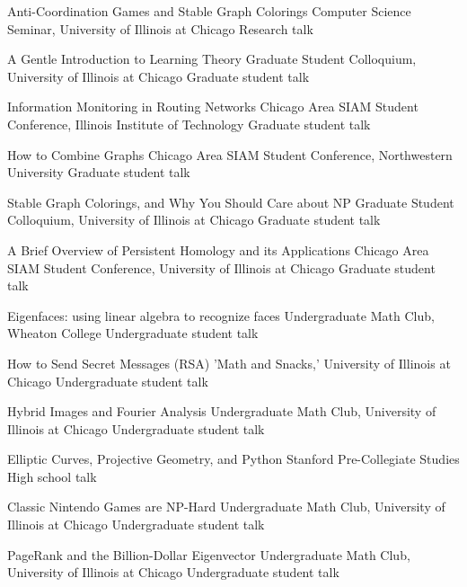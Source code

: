 \documentclass[11pt]{moderncv}
\begin{document}
         {Anti-Coordination Games and Stable Graph Colorings}
      {Computer Science Seminar, University of Illinois at Chicago}
      {Research talk}
      {}
{}

         {A Gentle Introduction to Learning Theory}
      {Graduate Student Colloquium, University of Illinois at Chicago}
      {Graduate student talk}
      {}
{}

         {Information Monitoring in Routing Networks}
      {Chicago Area SIAM Student Conference, Illinois Institute of Technology}
      {Graduate student talk}
      {}
{}

         {How to Combine Graphs}
      {Chicago Area SIAM Student Conference, Northwestern University}
      {Graduate student talk}
      {}
{}

         {Stable Graph Colorings, and Why You Should Care about NP}
      {Graduate Student Colloquium, University of Illinois at Chicago}
      {Graduate student talk}
      {}
{}

         {A Brief Overview of Persistent Homology and its Applications}
      {Chicago Area SIAM Student Conference, University of Illinois at Chicago}
      {Graduate student talk}
      {}
{}

         {Eigenfaces: using linear algebra to recognize faces}
      {Undergraduate Math Club, Wheaton College}
      {Undergraduate student talk}
      {}
{}

         {How to Send Secret Messages (RSA)}
      {'Math and Snacks,' University of Illinois at Chicago}
      {Undergraduate student talk}
      {}
{}

         {Hybrid Images and Fourier Analysis}
      {Undergraduate Math Club, University of Illinois at Chicago}
      {Undergraduate student talk}
      {}
{}

         {Elliptic Curves, Projective Geometry, and Python}
      {Stanford Pre-Collegiate Studies}
      {High school talk}
      {}
{}

         {Classic Nintendo Games are NP-Hard}
      {Undergraduate Math Club, University of Illinois at Chicago}
      {Undergraduate student talk}
      {}
{}

         {PageRank and the Billion-Dollar Eigenvector}
      {Undergraduate Math Club, University of Illinois at Chicago}
      {Undergraduate student talk}
      {}
{}
\end{document}
